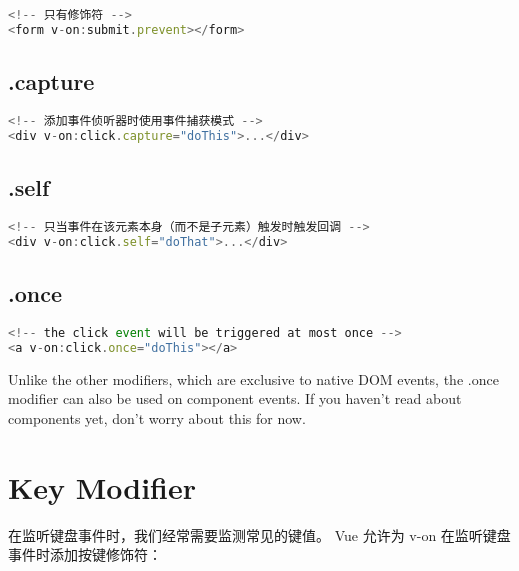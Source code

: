 \begin{lstlisting}[language=JavaScript]
<!-- 只有修饰符 -->
<form v-on:submit.prevent></form>
\end{lstlisting}



\subsection{.capture}


\begin{lstlisting}[language=JavaScript]
<!-- 添加事件侦听器时使用事件捕获模式 -->
<div v-on:click.capture="doThis">...</div>
\end{lstlisting}

\subsection{.self}

\begin{lstlisting}[language=JavaScript]
<!-- 只当事件在该元素本身（而不是子元素）触发时触发回调 -->
<div v-on:click.self="doThat">...</div>
\end{lstlisting}

\subsection{.once}

\begin{lstlisting}[language=JavaScript]
<!-- the click event will be triggered at most once -->
<a v-on:click.once="doThis"></a>
\end{lstlisting}




Unlike the other modifiers, which are exclusive to native DOM events, the .once modifier can also be used on component events. If you haven’t read about components yet, don’t worry about this for now.








\section{Key Modifier}



在监听键盘事件时，我们经常需要监测常见的键值。 Vue 允许为 v-on 在监听键盘事件时添加按键修饰符：



